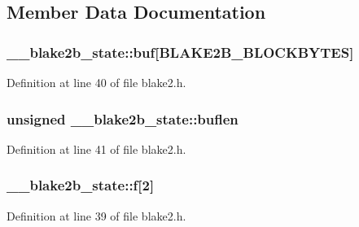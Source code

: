 \subsection{Member Data Documentation}
\hypertarget{struct____blake2b__state_ab56d8559f6de9a905c64df6214113e94}{}
\subsubsection[{buf}]{ \+\_\+\+\_\+blake2b\+\_\+state\+::buf\mbox{[}{\bf B\+L\+A\+K\+E2\+B\+\_\+\+B\+L\+O\+C\+K\+B\+Y\+T\+E\+S}\mbox{]}}\label{struct____blake2b__state_ab56d8559f6de9a905c64df6214113e94}


Definition at line 40 of file blake2.\+h.

\hypertarget{struct____blake2b__state_a613f0decce59102cabda809ef7ff7f3b}{}
\subsubsection[{buflen}]{\setlength{\rightskip}{0pt plus 5cm}unsigned \+\_\+\+\_\+blake2b\+\_\+state\+::buflen}\label{struct____blake2b__state_a613f0decce59102cabda809ef7ff7f3b}


Definition at line 41 of file blake2.\+h.

\hypertarget{struct____blake2b__state_a611101aaef0e6a2916d83266696ddf45}{}
\subsubsection[{f}]{ \+\_\+\+\_\+blake2b\+\_\+state\+::f\mbox{[}2\mbox{]}}\label{struct____blake2b__state_a611101aaef0e6a2916d83266696ddf45}


Definition at line 39 of file blake2.\+h.

\hypertarget{struct____blake2b__state_a98f8e01951c0944e82dff97c9a5ae700}{}
